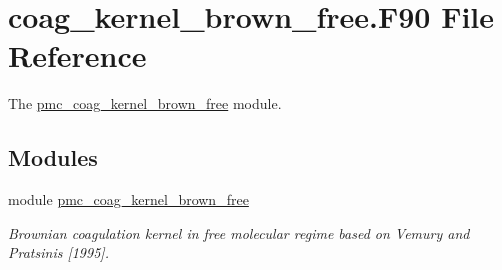 \hypertarget{coag__kernel__brown__free_8_f90}{}\section{coag\+\_\+kernel\+\_\+brown\+\_\+free.\+F90 File Reference}
\label{coag__kernel__brown__free_8_f90}


The \mbox{\hyperlink{namespacepmc__coag__kernel__brown__free}{pmc\+\_\+coag\+\_\+kernel\+\_\+brown\+\_\+free}} module.  


\subsection*{Modules}
\begin{DoxyCompactItemize}
\item 
module \mbox{\hyperlink{namespacepmc__coag__kernel__brown__free}{pmc\+\_\+coag\+\_\+kernel\+\_\+brown\+\_\+free}}
\begin{DoxyCompactList}\small\item\em Brownian coagulation kernel in free molecular regime based on Vemury and Pratsinis \mbox{[}1995\mbox{]}. \end{DoxyCompactList}\end{DoxyCompactItemize}
